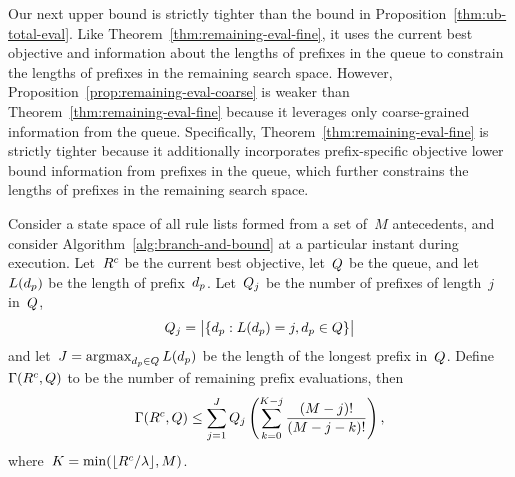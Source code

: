 \begin{arxiv}

Our next upper bound is strictly tighter than the bound in
Proposition~\ref{thm:ub-total-eval}.
%
Like Theorem~\ref{thm:remaining-eval-fine}, it uses the
current best objective and information about
the lengths of prefixes in the queue to constrain
the lengths of prefixes in the remaining search space.
%
However, Proposition~\ref{prop:remaining-eval-coarse}
is weaker than Theorem~\ref{thm:remaining-eval-fine} because
it leverages only coarse-grained information from the queue.
%
Specifically, Theorem~\ref{thm:remaining-eval-fine} is
strictly tighter because it additionally incorporates
prefix-specific objective lower bound information from
prefixes in the queue, which further constrains
the lengths of prefixes in the remaining search space.

\begin{proposition} \hfill
\label{prop:remaining-eval-coarse}
Consider a state space of all rule lists formed from a set of~$M$ antecedents,
and consider Algorithm~\ref{alg:branch-and-bound} at a particular instant
during execution.
%
Let~${R^c}$ be the current best objective, let~$Q$ be the queue,
and let~$L(d_p)$ be the length of prefix~$d_p$.
%
Let~$Q_j$ be the number of prefixes of length~$j$ in~$Q$,
\begin{align}
Q_j = \big | \{ d_p : L(d_p) = j, d_p \in Q \} \big |
\end{align}
and let~${J = \operatorname*{argmax}_{d_p \in Q} L(d_p)}$
be the length of the longest prefix in~$Q$.
%
Define~${\Gamma({R^c}, Q)}$ to be the number of remaining
prefix evaluations, then
\begin{align}
\Gamma({R^c}, Q)
\le \sum_{j=1}^J Q_j \left( \sum_{k=0}^{K-j} \frac{(M-j)!}{(M-j - k)!} \right),
\end{align}
where~${K = \min(\lfloor {R^c} / {\lambda} \rfloor, M)}$.
\end{proposition}


\end{arxiv}
